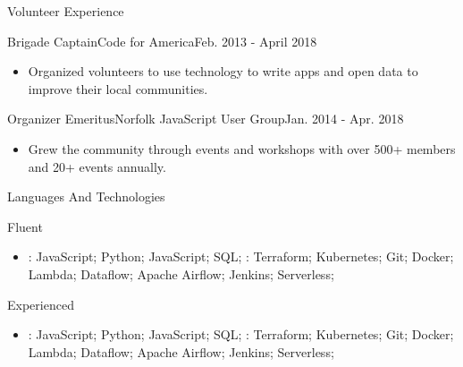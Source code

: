 \documentclass[]{mcdowellcv}
\begin{document}
    \begin{cvsection}{Volunteer Experience}
        \begin{cvsubsection}{Brigade Captain}{Code for America}{Feb. 2013 - April 2018}
            \begin{itemize}
                \item Organized volunteers to use technology to write apps and open data to improve their local communities.
            \end{itemize}

        \end{cvsubsection}

        \begin{cvsubsection}{Organizer Emeritus}{Norfolk JavaScript User Group}{Jan. 2014 - Apr. 2018}
            \begin{itemize}
                \item Grew the community through events and workshops with over 500+ members and 20+ events annually.
            \end{itemize}
        \end{cvsubsection}
    \end{cvsection}

    \begin{cvsection}{Languages And Technologies}
        \begin{cvsubsection}{Fluent}{}{}
            \begin{itemize}
                    \item {}: JavaScript; Python; JavaScript; SQL; \newline
                    : Terraform; Kubernetes; Git; Docker; Lambda; Dataflow; Apache Airflow; Jenkins; Serverless;
            \end{itemize}
        \end{cvsubsection}
        \begin{cvsubsection}{Experienced}{}{}
            \begin{itemize}
                    \item {}: JavaScript; Python; JavaScript; SQL; \newline
                    : Terraform; Kubernetes; Git; Docker; Lambda; Dataflow; Apache Airflow; Jenkins; Serverless;
            \end{itemize}
        \end{cvsubsection}

    \end{cvsection}
\end{document}
